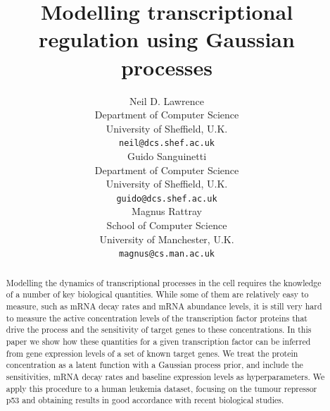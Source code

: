 \documentclass[english]{article}
\title{Modelling transcriptional regulation using Gaussian processes}
\author{
Neil D. Lawrence \\
Department of Computer Science\\
University of Sheffield, U.K.\\
\texttt{neil@dcs.shef.ac.uk} \\
\And
Guido Sanguinetti\\
Department of Computer Science\\
University of Sheffield, U.K. \\
\texttt{guido@dcs.shef.ac.uk} \\
\And
Magnus Rattray\\
School of Computer Science \\
University of Manchester, U.K. \\
\texttt{magnus@cs.man.ac.uk} \\
}
\begin{document}
\maketitle

\begin{abstract}
Modelling the dynamics of transcriptional processes in the cell requires the
knowledge of a number of key biological quantities. While some of them are
relatively easy to measure, such as mRNA decay rates and mRNA abundance levels,
it is still very hard to measure the active concentration levels of the 
transcription factor proteins that drive the process and the sensitivity of
target genes to these concentrations. In this paper we show how these 
quantities for a given transcription factor can be inferred
from gene expression levels of a set of known target genes. We treat the
protein concentration as a latent function with a Gaussian process prior, and
include the sensitivities, mRNA decay rates and baseline expression levels as
hyperparameters. We apply this procedure to a human leukemia dataset, focusing
on the tumour repressor p53 and obtaining results in good accordance with 
recent biological studies.
\end{abstract}
\end{document}
